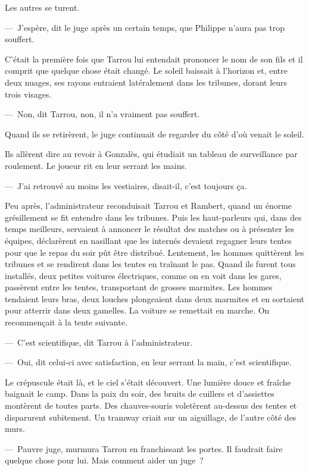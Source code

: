 \documentclass[french,twoside]{book} %
\begin{document}
Les autres se turent.\par
— J’espère, dit le juge après un certain temps, que Philippe n’aura pas trop souffert.\par
C’était la première fois que Tarrou lui entendait prononcer le nom de son fils et il comprit que quelque chose était changé. Le soleil baissait à l’horizon et, entre deux nuages, ses rayons entraient latéralement dans les tribunes, dorant leurs trois visages.\par
— Non, dit Tarrou, non, il n’a vraiment pas souffert.\par
Quand ils se retirèrent, le juge continuait de regarder du côté d’où venait le soleil.\par
Ils allèrent dire au revoir à Gonzalès, qui étudiait un tableau de surveillance par roulement. Le joueur rit en leur serrant les mains.\par
— J’ai retrouvé au moins les vestiaires, disait-il, c’est toujours ça.\par
Peu après, l’administrateur reconduisait Tarrou et Rambert, quand un énorme grésillement se fit entendre dans les tribunes. Puis les haut-parleurs qui, dans des temps meilleurs, servaient à annoncer le résultat des matches ou à présenter les équipes, déclarèrent en nasillant que les internés devaient regagner leurs tentes pour que le repas du soir pût être distribué. Lentement, les hommes quittèrent les tribunes et se rendirent dans les tentes en traînant le pas. Quand ils furent tous installés, deux petites voitures électriques, comme on en voit dans les gares, passèrent entre les tentes, transportant de grosses marmites. Les hommes tendaient leurs bras, deux louches plongeaient dans deux marmites et en sortaient pour atterrir dans deux gamelles. La voiture se remettait en marche. On recommençait à la tente suivante.\par
— C’est scientifique, dit Tarrou à l’administrateur.\par
— Oui, dit celui-ci avec satisfaction, en leur serrant la main, c’est scientifique.\par
Le crépuscule était là, et le ciel s’était découvert. Une lumière douce et fraîche baignait le camp. Dans la paix du soir, des bruits de cuillers et d’assiettes montèrent de toutes parts. Des chauves-souris voletèrent au-dessus des tentes et disparurent subitement. Un tramway criait sur un aiguillage, de l’autre côté des murs.\par
— Pauvre juge, murmura Tarrou en franchissant les portes. Il faudrait faire quelque chose pour lui. Mais comment aider un juge ?
\end{document}
